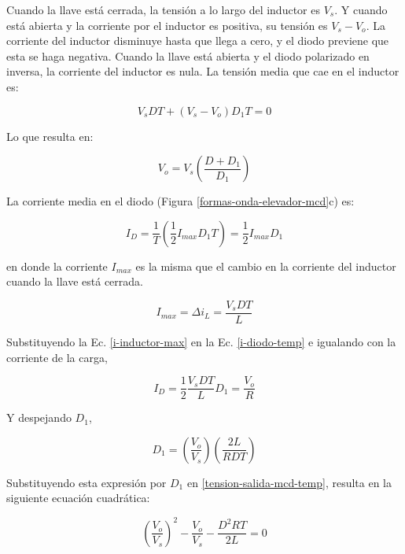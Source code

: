 Cuando la llave está cerrada, la tensión a lo largo del inductor es $V_s$. Y cuando está abierta y la corriente por el inductor es positiva, su tensión es $V_s - V_o$. La corriente del inductor disminuye hasta que llega a cero, y el diodo previene que esta se haga negativa. Cuando la llave está abierta y el diodo polarizado en inversa, la corriente del inductor es nula. La tensión media que cae en el inductor es:

\begin{equation*}
    V_s D T + (V_s - V_o) D_1 T = 0
\end{equation*}

Lo que resulta en:

\begin{equation}
    V_o = V_s \left(\frac{D+D_1}{D_1}\right)
    \label{tension-salida-mcd-temp}
\end{equation}

La corriente media en el diodo (Figura \ref{formas-onda-elevador-mcd}c) es: 

\begin{equation}
    I_D = \frac{1}{T} \left(\frac{1}{2} I_{max} D_1 T\right) = \frac{1}{2} I_{max} D_1
    \label{i-diodo-temp}
\end{equation}

en donde la corriente $I_{max}$ es la misma que el cambio en la corriente del inductor cuando la llave está cerrada.

\begin{equation}
    I_{max} = \Delta i_L = \frac{V_s D T}{L}
    \label{i-inductor-max}
\end{equation}

Substituyendo la Ec. \ref{i-inductor-max} en la Ec. \ref{i-diodo-temp} e igualando con la corriente de la carga,

\begin{equation}
    I_D = \frac{1}{2} \frac{V_s D T}{L} D_1 = \frac{V_o}{R}
\end{equation}

Y despejando $D_1$,

\begin{equation}
    \boxed{D_1 = \left(\frac{V_o}{V_s}\right) \left(\frac{2L}{R D T}\right)}
\end{equation}

Substituyendo esta expresión por $D_1$ en \ref{tension-salida-mcd-temp}, resulta en la siguiente ecuación cuadrática:

\begin{equation*}
    \left(\frac{V_o}{V_s}\right)^2 - \frac{V_o}{V_s} - \frac{D^2 R T}{2L} = 0
\end{equation*}

